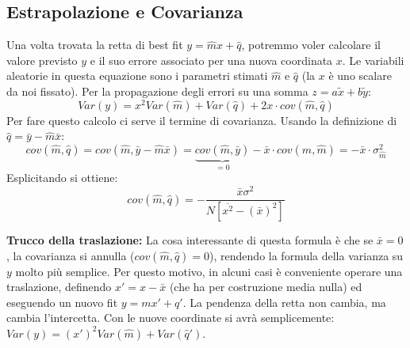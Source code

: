 \documentclass[openany,a4paper,12pt]{book}
\theoremstyle{remark}
\begin{document}
\subsection*{Estrapolazione e Covarianza}
Una volta trovata la retta di best fit $y = \hat{m}x + \hat{q}$, potremmo voler calcolare il valore previsto $y$ e il suo errore associato per una nuova coordinata $x$.
Le variabili aleatorie in questa equazione sono i parametri stimati $\hat{m}$ e $\hat{q}$ (la $x$ è uno scalare da noi fissato). Per la propagazione degli errori su una somma $z = a\tilde{x} + b\tilde{y}$:
\begin{equation}
    Var(y) = x^2 Var(\hat{m}) + Var(\hat{q}) + 2x \cdot cov(\hat{m}, \hat{q})
\end{equation}
Per fare questo calcolo ci serve il termine di covarianza. Usando la definizione di $\hat{q} = \bar{y} - \hat{m}\bar{x}$:
\begin{equation}
    cov(\hat{m}, \hat{q}) = cov(\hat{m}, \bar{y} - \hat{m}\bar{x}) = \underbrace{cov(\hat{m}, \bar{y})}_{=0} - \bar{x} \cdot cov(\hat{m}, \hat{m}) = - \bar{x} \cdot \sigma_{\hat{m}}^2
\end{equation}
Esplicitando si ottiene:
\begin{equation}
    cov(\hat{m}, \hat{q}) = - \frac{\bar{x} \sigma^2}{N[\overline{x^2} - (\bar{x})^2]}
\end{equation}

\textbf{Trucco della traslazione:} La cosa interessante di questa formula è che se $\bar{x} = 0$, la covarianza si annulla ($cov(\hat{m}, \hat{q})=0$), rendendo la formula della varianza su $y$ molto più semplice.
Per questo motivo, in alcuni casi è conveniente operare una traslazione, definendo $x' = x - \bar{x}$ (che ha per costruzione media nulla) ed eseguendo un nuovo fit $y = mx' + q'$. La pendenza della retta non cambia, ma cambia l'intercetta. Con le nuove coordinate si avrà semplicemente:
$Var(y) = (x')^2 Var(\hat{m}) + Var(\hat{q}')$.
\end{document}
